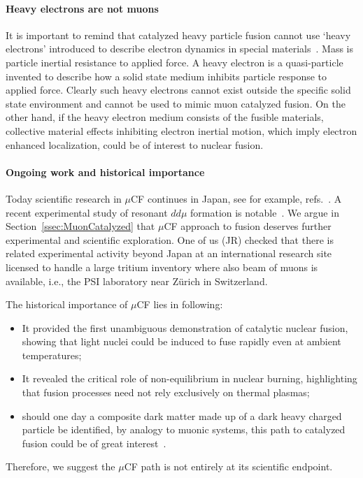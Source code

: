 \documentclass[particles,article,accept,pdftex,moreauthors]{Definitions/mdpi}
\newcommand{\rsec}[1]{Section~\ref{#1}}
\begin{document}
\paragraph*{\bf Heavy electrons are not muons}
It is important to remind that catalyzed heavy particle fusion cannot use `heavy electrons' introduced to describe electron dynamics in special materials~\cite{Kuramoto:2000}. Mass is particle inertial resistance to applied force. A heavy electron is a quasi-particle invented to describe how a solid state medium inhibits particle response to applied force. Clearly such heavy electrons cannot exist outside the specific solid state environment and cannot be used to mimic muon catalyzed fusion. On the other hand, if the heavy electron medium consists of the fusible materials, collective material effects inhibiting electron inertial motion, which imply electron enhanced localization, could be of interest to nuclear fusion.

\paragraph*{\bf Ongoing work and historical importance}
Today scientific research in $\mu$CF continues in Japan, see for example, refs.~\cite{Kamimura:2021msf,Yamashita:2022rtu}. A recent experimental study of resonant $dd\mu$ formation is notable~\cite{Toyama:2026}. We argue in \rsec{ssec:MuonCatalyzed} that $\mu$CF approach to fusion deserves further experimental and scientific exploration. One of us (JR) checked that there is related experimental activity beyond Japan at an international research site  licensed to handle a large tritium inventory where also beam of muons is available, i.e., the PSI laboratory near Z\"urich in Switzerland.
 
The historical importance of $\mu$CF lies in following:
\begin{itemize}
 \item[(a)] It provided the first unambiguous demonstration of catalytic nuclear fusion, showing that light nuclei could be induced to fuse rapidly even at ambient temperatures; 
 \item[(b)] It revealed the critical role of non-equilibrium in nuclear burning, highlighting that fusion processes need not rely exclusively on thermal plasmas;
 \item[(c)] should one day a composite dark matter made up of a dark heavy charged particle be identified, by analogy to muonic systems, this path to catalyzed fusion could be of great interest~\cite{Rafelski:1989pz}.
\end{itemize}
Therefore, we suggest the $\mu$CF path is not entirely at its scientific endpoint.
\end{document}
